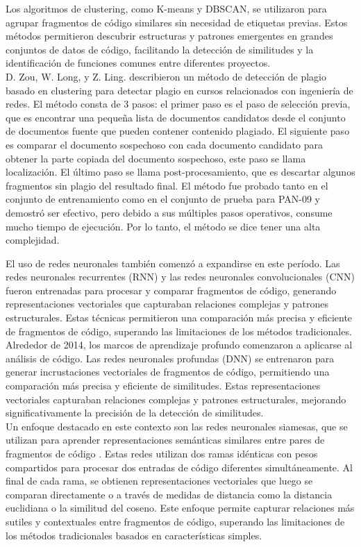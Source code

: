 Los algoritmos de clustering, como K-means y DBSCAN, se utilizaron para agrupar fragmentos de código similares sin necesidad de etiquetas previas. Estos métodos permitieron descubrir estructuras y patrones emergentes en grandes conjuntos de datos de código, facilitando la detección de similitudes y la identificación de funciones comunes entre diferentes proyectos. \\

D. Zou, W. Long, y Z. Ling. \cite{zou2010cluster} describieron un método de detección de plagio basado en clustering para detectar plagio en cursos relacionados con ingeniería de redes. El método consta de 3 pasos: el primer paso es el paso de selección previa, que es encontrar una pequeña lista de documentos candidatos desde el conjunto de documentos fuente que pueden contener contenido plagiado. El siguiente paso es comparar el documento sospechoso con cada documento candidato para obtener la parte copiada del documento sospechoso, este paso se llama localización. El último paso se llama post-procesamiento, que es descartar algunos fragmentos sin plagio del resultado final. El método fue probado tanto en el conjunto de entrenamiento como en el conjunto de prueba para PAN-09 y demostró ser efectivo, pero debido a sus múltiples pasos operativos, consume mucho tiempo de ejecución. Por lo tanto, el método se dice tener una alta complejidad. 

El uso de redes neuronales también comenzó a expandirse en este período. Las redes neuronales recurrentes (RNN) y las redes neuronales convolucionales (CNN) fueron entrenadas para procesar y comparar fragmentos de código, generando representaciones vectoriales que capturaban relaciones complejas y patrones estructurales. Estas técnicas permitieron una comparación más precisa y eficiente de fragmentos de código, superando las limitaciones de los métodos tradicionales. \\

Alrededor de 2014, los marcos de aprendizaje profundo comenzaron a aplicarse al análisis de código. Las redes neuronales profundas (DNN) se entrenaron para generar incrustaciones vectoriales de fragmentos de código, permitiendo una comparación más precisa y eficiente de similitudes. Estas representaciones vectoriales capturaban relaciones complejas y patrones estructurales, mejorando significativamente la precisión de la detección de similitudes. \\

Un enfoque destacado en este contexto son las redes neuronales siamesas, que se utilizan para aprender representaciones semánticas similares entre pares de fragmentos de código \cite{smith2020enhanced}. Estas redes utilizan dos ramas idénticas con pesos compartidos para procesar dos entradas de código diferentes simultáneamente. Al final de cada rama, se obtienen representaciones vectoriales que luego se comparan directamente o a través de medidas de distancia como la distancia euclidiana o la similitud del coseno. Este enfoque permite capturar relaciones más sutiles y contextuales entre fragmentos de código, superando las limitaciones de los métodos tradicionales basados en características simples.


